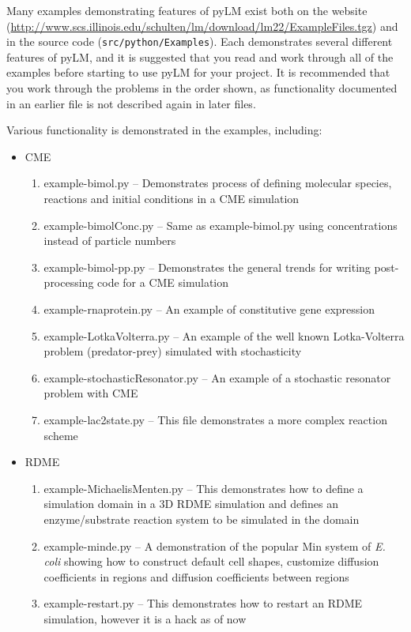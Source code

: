 Many examples demonstrating features of pyLM exist both on the website (\url{http://www.scs.illinois.edu/schulten/lm/download/lm22/ExampleFiles.tgz}) and in the source code (\texttt{src/python/Examples}).  Each demonstrates several different features of pyLM, and it is suggested that you read and work through all of the examples before starting to use pyLM for your project.  It is recommended that you work through the problems in the order shown, as functionality documented in an earlier file is not described again in later files.

Various functionality is demonstrated in the examples, including:

\begin{itemize}
\item CME
\begin{enumerate}
\item example-bimol.py -- Demonstrates process of defining molecular species, reactions  and initial conditions in a CME simulation
\item example-bimolConc.py -- Same as example-bimol.py using concentrations instead of particle numbers
\item example-bimol-pp.py -- Demonstrates the general trends for writing post-processing code for a CME simulation
\item example-rnaprotein.py -- An example of constitutive gene expression
\item example-LotkaVolterra.py -- An example of the well known Lotka-Volterra problem (predator-prey) simulated with stochasticity
\item example-stochasticResonator.py -- An example of a stochastic resonator problem with CME
\item example-lac2state.py -- This file demonstrates a more complex reaction scheme
\end{enumerate}

\item RDME
\begin{enumerate}
\item example-MichaelisMenten.py -- This demonstrates how to define a simulation domain in a 3D RDME simulation and defines an enzyme/substrate reaction system to be simulated in the domain
\item example-minde.py -- A demonstration of the popular Min system of {\it E. coli} showing how to construct default cell shapes, customize diffusion coefficients in regions and diffusion coefficients between regions
\item example-restart.py -- This demonstrates how to restart an RDME simulation, however it is a hack as of now
\end{enumerate}


\end{itemize}
